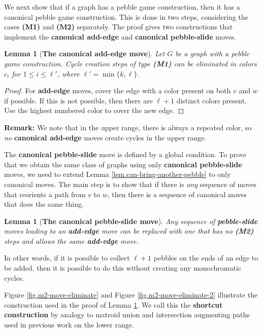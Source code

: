 \documentclass[Svgc,nospthms]{Svgc}
\newcommand{\reffig}[1]{Figure \ref{fig.#1}}
\newtheorem{lemma}[theorem]{Lemma}
\newcommand{\reflem}[1]{Lemma \ref{lem.#1}}
\newcommand{\labellem}[1]{\label{lem.#1}}
\begin{document}
	We next show that if a graph has a pebble game construction, then it has a canonical pebble 
	game construction.  This is done in two steps, considering the cases {\bf (M1)} and {\bf (M2)}
	separately.  The proof gives two constructions that implement the {\bf canonical add-edge}
	and {\bf canonical pebble-slide} moves.
	
	\begin{lemma}[{\bf The canonical add-edge move}]
		Let $G$ be a graph with a pebble game construction. 
		Cycle creation steps of type {\bf (M1)} can be eliminated in colors $c_{i}$ for $1\le i\le \ell'$, 
		where $\ell'=\min\{k,\ell\}$. \labellem{can-kill-m1-moves} 
	\end{lemma}
	\begin{proof}
		For {\bf add-edge} moves, cover the edge with a color present on both $v$ and $w$ 
		if possible. If this is not possible, then there are $\ell+1$ 
		distinct colors present. Use the highest numbered color to cover 
		the new edge. 
	 \end{proof}
	
	{\bf Remark:} We note that in the upper range, there is always a repeated color, so 
	{\it no} {\bf canonical add-edge} moves create cycles in the upper range.
	
	
	The {\bf canonical pebble-slide} move is defined by a global condition.  To prove that
	we obtain the same class of graphs using only {\bf canonical pebble-slide} moves, 
	we need to extend \reflem{can-bring-another-pebble} to only 
	canonical moves.  The main step is to show that if there is {\it any }
	sequence of moves that reorients a path from $v$ to $w$, then there is 
	a sequence of canonical moves that does the same thing.
	
	\begin{lemma}[{\bf The canonical pebble-slide move}]\labellem{kill-m2-moves-locally}
		Any sequence of {\bf pebble-slide} moves leading to an {\bf add-edge}
		move can be replaced with one that has no {\bf (M2)} steps and allows the
		same {\bf add-edge} move. 
	\end{lemma}
	In other words, if it is possible to collect $\ell+1$ pebbles on the ends 
	of an edge to be added, then it is possible to do this without creating 
	any monochromatic cycles.
		
	\reffig{m2-move-eliminate} and \reffig{m2-move-eliminate-2} illustrate the
	construction used in the proof of \reflem{kill-m2-moves-locally}.  We call this 
	the {\bf shortcut construction} by analogy to matroid union and intersection 
	augmenting paths used in previous work on the lower range.
	
\end{document}
